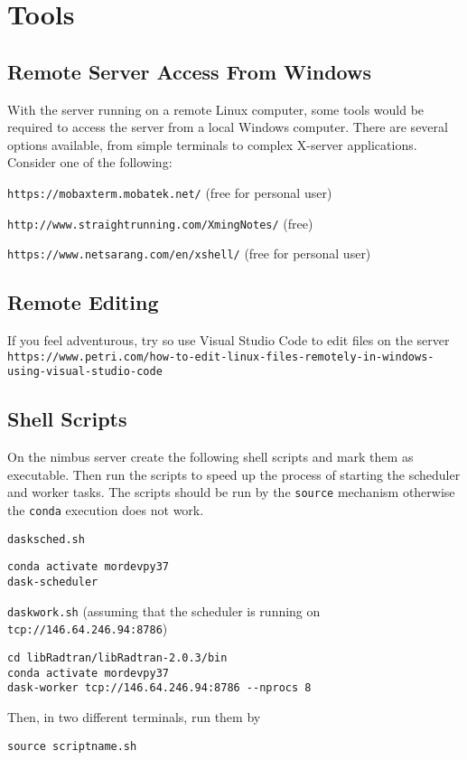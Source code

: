 \chapter{Tools}
\label{chap:Tools}

\section{Remote Server Access From Windows}
\label{sec:RemoteServerAccessFromWindows}

With the \libraddask{} server running on a remote Linux computer, some tools would be required to access the server from a local Windows computer.  There are several options available, from simple terminals to complex X-server applications.  Consider one of the following:


\lstinline{https://mobaxterm.mobatek.net/} (free for personal user) 

\lstinline{http://www.straightrunning.com/XmingNotes/} (free)

\lstinline{https://www.netsarang.com/en/xshell/} (free for personal user)


\section{Remote Editing}
If you feel adventurous, try so use Visual Studio Code to edit files on the server\\
\lstinline{https://www.petri.com/how-to-edit-linux-files-remotely-in-windows-using-visual-studio-code } 

\section{Shell Scripts}

On the nimbus server create the following shell scripts and mark them as executable. Then run the scripts to speed up the process of starting the scheduler and worker tasks.  The scripts should be run by the \lstinline{source} mechanism otherwise the \lstinline{conda} execution does not work.

\lstinline{dasksched.sh}
\begin{lstlisting}
conda activate mordevpy37
dask-scheduler
\end{lstlisting}

\lstinline{daskwork.sh} (assuming that the scheduler is running on \lstinline{tcp://146.64.246.94:8786})
\begin{lstlisting}
cd libRadtran/libRadtran-2.0.3/bin    
conda activate mordevpy37    
dask-worker tcp://146.64.246.94:8786 --nprocs 8
\end{lstlisting}

Then, in two different terminals, run them by
\begin{lstlisting}
source scriptname.sh
\end{lstlisting}
